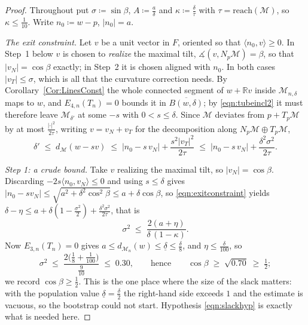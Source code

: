 \documentclass[11pt]{amsart}%
\theoremstyle{plain}
\newcommand{\R}{{\mathbb R}}
\newcommand{\1}{\mathbf{1}}
\newcommand{\M}{\mathcal{M}}
\begin{document}
\begin{proof}
    Throughout put $\sigma\coloneqq\sin\beta$, $A\coloneqq \frac{a}{\delta}$ and $\kappa\coloneqq\frac{\delta}{\tau}$
    with $\tau=\mathrm{reach}(\M)$, so $\kappa\le\frac{1}{10}$. Write $n_0\coloneqq w-p$, $|n_0|=a$.

    \emph{The exit constraint.} Let $v$ be a unit vector in $F$, oriented so that
    $\langle n_0,v\rangle\ge0$. In Step~1 below $v$ is chosen to \emph{realize} the maximal tilt,
    $\measuredangle(v,N_p\M)=\beta$, so that $|v_N|=\cos\beta$ exactly; in Step~2 it is chosen aligned with
    $n_0$. In both cases $|v_T|\le\sigma$, which is all that the curvature correction needs. By Corollary~\ref{Cor:LinesConst} the whole connected segment of
    $w+\R v$ inside $\M_{n,\delta}$ maps to $w$, and $E_{4,n}(T_n)=0$ bounds it in
    $\overline{B(w,\delta)}$; by \eqref{eqn:tubeincl2} it must therefore leave $\M_{\delta'}$ at some
    $-s$ with $0<s\le\delta$. Since $\M$ deviates from $p+T_p\M$ by at most
    $\frac{|\cdot|^2}{2\tau}$, writing $v=v_N+v_T$ for the decomposition along $N_p\M\oplus T_p\M$,
    \begin{equation}\label{eqn:exitconstraint}
        \delta'\;\le\;d_\M(w-sv)\;\le\;\bigl|n_0-s\,v_N\bigr|+\frac{s^2|v_T|^2}{2\tau}
        \;\le\;\bigl|n_0-s\,v_N\bigr|+\frac{\delta^2\sigma^2}{2\tau}.
    \end{equation}

    \emph{Step 1: a crude bound.} Take $v$ realizing the maximal tilt, so $|v_N|=\cos\beta$.
    Discarding $-2s\langle n_0,v_N\rangle\le0$ and using $s\le\delta$ gives
    $|n_0-sv_N|\le\sqrt{a^2+\delta^2\cos^2\beta}\le a+\delta\cos\beta$, so
    \eqref{eqn:exitconstraint} yields
    $\delta-\eta\le a+\delta(1-\frac{\sigma^2}{2})+\frac{\delta^2\sigma^2}{2\tau}$, that is
    \begin{equation}\label{eqn:tiltbound}
        \sigma^2\;\le\;\frac{2(a+\eta)}{\delta\,(1-\kappa)} .
    \end{equation}
    Now $E_{3,n}(T_n)=0$ gives $a\le d_{\M_n}(w)\le\underline\delta\le\frac{\delta}{8}$, and
    $\eta\le\frac{\delta}{100}$, so
    \[
        \sigma^2\;\le\;\frac{2\bigl(\tfrac18+\tfrac1{100}\bigr)}{\tfrac9{10}}\;\le\;0.30 ,
        \qquad\text{hence}\qquad \cos\beta\;\ge\;\sqrt{0.70}\;\ge\;\tfrac12 ;
    \]
    we record $\cos\beta\ge\frac{1}{2}$. This is the one place where the size of the slack matters: with
    the population value $\underline\delta=\frac{\delta}{2}$ the right-hand side exceeds $1$ and the
    estimate is vacuous, so the bootstrap could not start. Hypothesis \eqref{eqn:slackhyp} is
    exactly what is needed here.


\end{proof}
\end{document}
